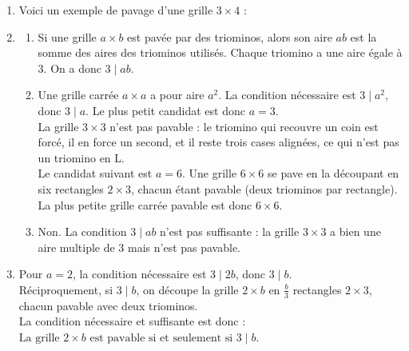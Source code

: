 \begin{enumerate}
\item Voici un exemple de pavage d'une grille $3 \times 4$ :

\begin{center}
\end{center}


\item \begin{enumerate}
\item Si une grille $a \times b$ est pavée par des triominos, alors son aire $ab$ est la somme des aires des triominos utilisés. Chaque triomino a une aire égale à $3$. On a donc $3 \mid ab$.

\item Une grille carrée $a \times a$ a pour aire $a^2$. La condition nécessaire est $3 \mid a^2$, donc $3 \mid a$. Le plus petit candidat est donc $a = 3$. \\
La grille $3 \times 3$ n'est pas pavable : le triomino qui recouvre un coin est forcé, il en force un second, et il reste trois cases alignées, ce qui n'est pas un triomino en L. \\
Le candidat suivant est $a = 6$. Une grille $6 \times 6$ se pave en la découpant en six rectangles $2 \times 3$, chacun étant pavable (deux triominos par rectangle). \\
La plus petite grille carrée pavable est donc $\boxed{6 \times 6}$.

\item Non. La condition $3 \mid ab$ n'est pas suffisante : la grille $3 \times 3$ a bien une aire multiple de $3$ mais n'est pas pavable.
\end{enumerate}

\item Pour $a = 2$, la condition nécessaire est $3 \mid 2b$, donc $3 \mid b$. \\
Réciproquement, si $3 \mid b$, on découpe la grille $2 \times b$ en $\frac{b}{3}$ rectangles $2 \times 3$, chacun pavable avec deux triominos. \\
La condition nécessaire et suffisante est donc : \\
$\boxed{\text{La grille } 2 \times b \text{ est pavable si et seulement si } 3 \mid b.}$


\end{enumerate}
